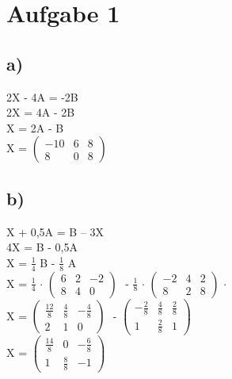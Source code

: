 \documentclass{article}
\begin{document}
	\section*{Aufgabe 1}
	\subsection*{a)}
	2X - 4A = -2B \\
	2X = 4A - 2B \\
	X = 2A - B \\
	X = $
	\left(\begin{array}{ccc}
	-10 & 6 & 8 \\ 8 & 0 & 8
	\end{array}\right)
	$
	\subsection*{b)}
	X + 0,5A = B – 3X \\
	4X = B - 0,5A \\
	X = $\frac{1}{4}$ B - $\frac{1}{8}$ A \\
	X = 
	$\frac{1}{4}$ $\cdot$
	$
	\left(\begin{array}{ccc}
	6 & 2 & -2 \\ 8 & 4 & 0	
	\end{array}\right)$ 
	$
	$
	- $\frac{1}{8}$ $\cdot$
	$
	\left(\begin{array}{ccc}
	-2 & 4 & 2 \\ 8 & 2 & 8	
	\end{array}\right)$ $\cdot$
	$
	$ \\
	X = 
	$
	\left(\begin{array}{ccc}
	\frac{12}{8} & \frac{4}{8} & -\frac{4}{8} \\ 2 & 1 & 0	
	\end{array}\right)$ 
	$
	$
	- 
	$
	\left(\begin{array}{ccc}
	-\frac{2}{8} & \frac{4}{8} & \frac{2}{8}
	 \\ 1 & \frac{2}{8} & 1	
	\end{array}\right)$
	$
	$ \\
	X = 
	$
	\left(\begin{array}{ccc}
	\frac{14}{8} & 0 & -\frac{6}{8} \\ 1 & \frac{8}{8} & -1	
	\end{array}\right)$ 
	$
	$
\end{document}
